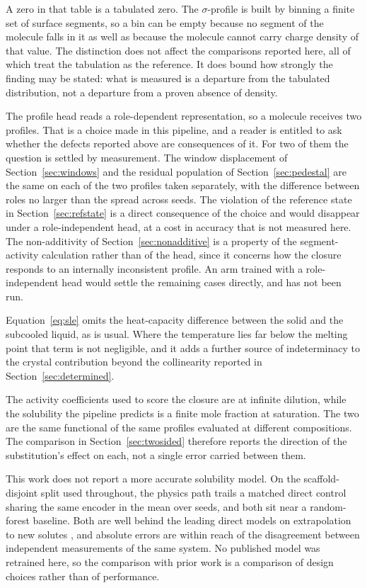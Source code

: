 A zero in that table is a tabulated zero. The $\sigma$-profile is built by binning a finite set of
surface segments, so a bin can be empty because no segment of the molecule falls in it as well as
because the molecule cannot carry charge density of that value. The distinction does not affect the
comparisons reported here, all of which treat the tabulation as the reference. It does bound how
strongly the finding may be stated: what is measured is a departure from the tabulated
distribution, not a departure from a proven absence of density.

The profile head reads a role-dependent representation, so a molecule receives two profiles. That
is a choice made in this pipeline, and a reader is entitled to ask whether the defects reported
above are consequences of it. For two of them the question is settled by measurement. The window
displacement of Section~\ref{sec:windows} and the residual population of
Section~\ref{sec:pedestal} are the same on each of the two profiles taken separately, with the
difference between roles no larger than the spread across seeds. The violation of the reference
state in Section~\ref{sec:refstate} is a direct consequence of the choice and would disappear under
a role-independent head, at a cost in accuracy that is not measured here. The non-additivity of
Section~\ref{sec:nonadditive} is a property of the segment-activity calculation rather than of the
head, since it concerns how the closure responds to an internally inconsistent profile. An arm
trained with a role-independent head would settle the remaining cases directly, and has not been
run.

Equation~\eqref{eq:sle} omits the heat-capacity difference between the solid and the subcooled
liquid, as is usual. Where the temperature lies far below the melting point that term is not
negligible, and it adds a further source of indeterminacy to the crystal contribution beyond the
collinearity reported in Section~\ref{sec:determined}.

The activity coefficients used to score the closure are at infinite dilution, while the solubility
the pipeline predicts is a finite mole fraction at saturation. The two are the same functional of
the same profiles evaluated at different compositions. The comparison in
Section~\ref{sec:twosided} therefore reports the direction of the substitution's effect on each,
not a single error carried between them.

This work does not report a more accurate solubility model. On the scaffold-disjoint split used
throughout, the physics path trails a matched direct control sharing the same encoder in the mean
over seeds, and both sit near a random-forest baseline. Both are well behind the leading direct
models on extrapolation to new solutes \cite{osanloo2024}, and absolute errors are within reach of
the disagreement between independent measurements of the same system. No published model was
retrained here, so the comparison with prior work is a comparison of design choices rather than of
performance.

